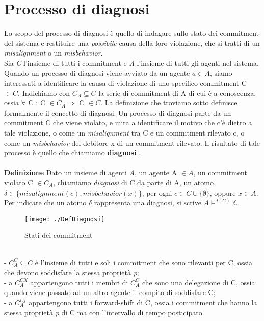 \documentclass[a4paper,12pt]{report}
\begin{document}
\section{Processo di diagnosi}
Lo scopo del processo di diagnosi è quello di indagare sullo stato dei commitment del sistema e restituire una \textit{possibile} causa della loro violazione, che si tratti di un \textit{misalignment} o un \textit{misbehavior}.\\
Sia \textit{C} l'insieme di tutti i commitment e \textit{A} l'insieme di tutti gli agenti nel sistema. Quando un processo di diagnosi viene avviato da un agente $a\in A$, siamo interessati a identificare la causa di violazione di uno specifico commitment C $\in C$. Indichiamo con $C_A \subseteq C$ la serie di commitment di A di cui è a conoscenza, ossia $\forall$ C : C $\in C_A \Rightarrow$ C $\in C$.
La definizione che troviamo sotto definisce formalmente il concetto di diagnosi. Un processo di diagnosi parte da un commitment C che viene violato, e mira a identificare il motivo che c'è dietro a tale violazione, o come un \textit{misalignment} tra C e un commitment rilevato c, o come un \textit{misbehavior} del debitore x di un commitment rilevato. Il risultato di tale processo è quello che chiamiamo \textbf{diagnosi} \cite{rif5}.\\
\\\textbf{Definizione} Dato un insieme di agenti \textit{A}, un agente A $\in A$, un commitment violato C $\in C_A$, chiamiamo \textit{diagnosi} di C da parte di A, un atomo $\delta \in \{misalignment(c),misbehavior(x)\}$, per ogni $c \in C \cup \{\emptyset \}$, oppure $x \in A$.
\\Per indicare che un atomo $\delta$ rappresenta una diagnosi, si scrive $A \models^{d(C)} \delta$.
\begin{figure}[h]
    \begin{center}
        \texttt{[image: ./DefDiagnosi]}
        \caption{Stati dei commitment}
        \label{CEC-REC}
    \end{center}
\end{figure}
\\- $C^C_A \subseteq C$ è l'insieme di tutti e soli i commitment che sono rilevanti per C, ossia che devono soddisfare la stessa proprietà \textit{p};
\\- a $C^{CX}_A$ appartengono tutti i membri di $C^C_A$ che sono una delegazione di C, ossia quando viene passato ad un altro agente il compito di soddisfare C;
\\- a $C^{Cf}_A$ appartengono tutti i forward-shift di C, ossia i commitment che hanno la stessa proprietà \textit{p} di C ma con l'intervallo di tempo posticipato.
\end{document}
